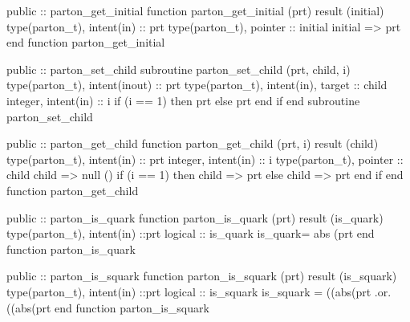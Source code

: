 \eatline
\nwendcode{}\nwdocspar
\nwenddocs{}\plusendmoddef
  public :: parton_get_initial
\nwendcode{}\plusendmoddef
  function parton_get_initial (prt) result (initial)
    type(parton_t), intent(in) :: prt
    type(parton_t), pointer :: initial
    initial => prt%
  end function parton_get_initial

\eatline
\nwendcode{}\nwdocspar
\nwenddocs{}\plusendmoddef
  public :: parton_set_child
\nwendcode{}\plusendmoddef
  subroutine parton_set_child (prt, child, i)
    type(parton_t), intent(inout) :: prt
    type(parton_t), intent(in), target :: child
    integer, intent(in) ::  i
    if (i == 1) then
       prt%
    else
       prt%
    end if
  end subroutine parton_set_child

\eatline
\nwendcode{}\nwdocspar
\nwenddocs{}\plusendmoddef
  public :: parton_get_child
\nwendcode{}\plusendmoddef
  function parton_get_child (prt, i) result (child)
    type(parton_t), intent(in) :: prt
    integer, intent(in) :: i
    type(parton_t), pointer :: child
    child => null ()
    if (i == 1) then
       child => prt%
    else
       child => prt%
    end if
  end function parton_get_child

\eatline
\nwendcode{}\nwdocspar
\nwenddocs{}\plusendmoddef
  public :: parton_is_quark
\nwendcode{}\nwdocspar
\nwenddocs{}\plusendmoddef
  function parton_is_quark (prt) result (is_quark)
    type(parton_t), intent(in) ::prt
    logical :: is_quark
    is_quark= abs (prt%
  end function parton_is_quark

\eatline
\nwendcode{}\nwdocspar
\nwenddocs{}\plusendmoddef
  public :: parton_is_squark
\nwendcode{}\plusendmoddef
  function parton_is_squark (prt) result (is_squark)
    type(parton_t), intent(in) ::prt
    logical :: is_squark
    is_squark = ((abs(prt%
             .or. ((abs(prt%
  end function parton_is_squark

